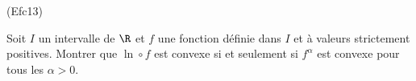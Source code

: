 \begin{tiny}(Efc13)\end{tiny} Soit $I$ un intervalle de $\R$ et $f$ une fonction définie dans $I$ et à valeurs strictement positives. Montrer que $\ln\circ f$ est convexe si et seulement si $f^\alpha$ est convexe pour tous les $\alpha >0$. 